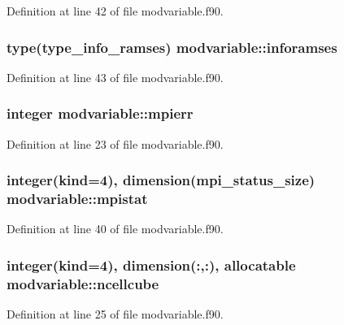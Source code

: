 Definition at line 42 of file modvariable.\-f90.

\hypertarget{classmodvariable_a9da60aa446a9c549bfd44c1e4ef5a6cb}{
\subsubsection[{inforamses}]{\setlength{\rightskip}{0pt plus 5cm}type(type\-\_\-info\-\_\-ramses) modvariable\-::inforamses}}\label{classmodvariable_a9da60aa446a9c549bfd44c1e4ef5a6cb}


Definition at line 43 of file modvariable.\-f90.

\hypertarget{classmodvariable_a85886f33027f4edc9331bd9ada689d22}{
\subsubsection[{mpierr}]{\setlength{\rightskip}{0pt plus 5cm}integer modvariable\-::mpierr}}\label{classmodvariable_a85886f33027f4edc9331bd9ada689d22}


Definition at line 23 of file modvariable.\-f90.

\hypertarget{classmodvariable_a9d7821389828ef466b9e1fcffd62dd76}{
\subsubsection[{mpistat}]{\setlength{\rightskip}{0pt plus 5cm}integer(kind=4), dimension(mpi\-\_\-status\-\_\-size) modvariable\-::mpistat}}\label{classmodvariable_a9d7821389828ef466b9e1fcffd62dd76}


Definition at line 40 of file modvariable.\-f90.

\hypertarget{classmodvariable_a8bc6342027666b4dec0f7f417c754b55}{
\subsubsection[{ncellcube}]{\setlength{\rightskip}{0pt plus 5cm}integer(kind=4), dimension(\-:,\-:), allocatable modvariable\-::ncellcube}}\label{classmodvariable_a8bc6342027666b4dec0f7f417c754b55}


Definition at line 25 of file modvariable.\-f90.

